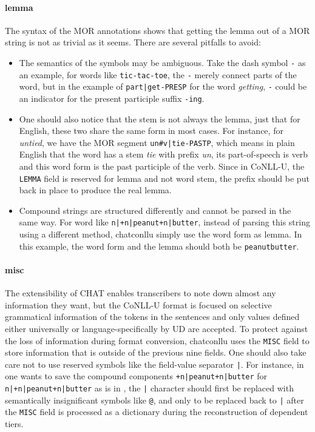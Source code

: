 \paragraph{lemma} The syntax of the MOR annotations shows that getting the lemma out of a MOR string is not as trivial as it seems. There are several pitfalls to avoid:
\begin{itemize}
	\item The semantics of the symbols may be ambiguous. Take the dash symbol \texttt{-} as an example, for words like \texttt{tic-tac-toe}, the \texttt{-} merely connect parts of the word, but in the example of \texttt{part|get-PRESP} for the word \emph{getting}, \texttt{-} could be an indicator for the present participle suffix \texttt{-ing}.
	\item One should also notice that the stem is not always the lemma, just that for English, these two share the same form in most cases. For instance, for \emph{untied}, we have the MOR segment \texttt{un\#v|tie-PASTP}, which means in plain English that the word has a stem \emph{tie} with prefix \emph{un}, its part-of-speech is verb and this word form is the past participle of the verb. Since in CoNLL-U, the \texttt{LEMMA} field is reserved for lemma and not word stem, the prefix should be put back in place to produce the real lemma.
	\item Compound strings are structured differently and cannot be parsed in the same way. For word like \texttt{n|+n|peanut+n|butter}, instead of parsing this string using a different method, chatconllu simply use the word form as lemma. In this example, the word form and the lemma should both be \texttt{peanutbutter}.
\end{itemize}

\paragraph{misc}
The extensibility of CHAT enables transcribers to note down almost any information they want, but the CoNLL-U format is focused on selective grammatical information of the tokens in the sentences and only values defined either universally or language-specifically by UD are accepted. To protect against the loss of information during format conversion, chatconllu uses the \texttt{MISC} field to store information that is outside of the previous nine fields.
One should also take care not to use reserved symbols like the field-value separator \texttt{|}. For instance, in one wants to save the compound components \texttt{+n|peanut+n|butter} for \texttt{n|+n|peanut+n|butter} as is in , the \texttt{|} character should first be replaced with semantically insignificant symbols like \texttt{@}, and only to be replaced back to \texttt{|} after the \texttt{MISC} field is processed as a dictionary during the reconstruction of dependent tiers.\\
\vspace{-1.5em}
